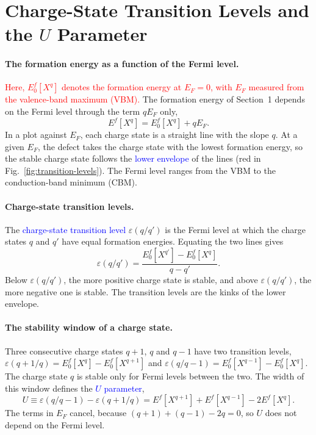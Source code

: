 \section{Charge-State Transition Levels and the $U$ Parameter}

\paragraph{The formation energy as a function of the Fermi level.}
\textcolor{red}{Here, $E^f_0[X^q]$ denotes the formation energy at $E_F=0$,
with $E_F$ measured from the valence-band maximum (VBM).}
The formation energy of Section~1 depends on the Fermi level through the
term $qE_F$ only,
\begin{equation*}
    E^f[X^q]=E^f_0[X^q]+qE_F.
\end{equation*}
In a plot against $E_F$, each charge state is a straight line with the slope
$q$. At a given $E_F$, the defect takes the charge state with the lowest
formation energy, so the stable charge state follows the
\textcolor{blue}{lower envelope} of the lines (red in
Fig.~\ref{fig:transition-levels}). The Fermi level ranges from the VBM to the
conduction-band minimum (CBM).

\paragraph{Charge-state transition levels.}
The \textcolor{blue}{charge-state transition level} $\varepsilon(q/q')$ is the
Fermi level at which the charge states $q$ and $q'$ have equal formation
energies. Equating the two lines gives
\begin{equation}
    \boxed{\varepsilon(q/q')=\frac{E^f_0[X^{q'}]-E^f_0[X^q]}{q-q'}.}
\end{equation}
Below $\varepsilon(q/q')$, the more positive charge state is stable, and
above $\varepsilon(q/q')$, the more negative one is stable. The transition
levels are the kinks of the lower envelope.

\paragraph{The stability window of a charge state.}
Three consecutive charge states $q+1$, $q$ and $q-1$ have two transition
levels, $\varepsilon(q+1/q)=E^f_0[X^q]-E^f_0[X^{q+1}]$ and
$\varepsilon(q/q-1)=E^f_0[X^{q-1}]-E^f_0[X^q]$. The charge state $q$ is
stable only for Fermi levels between the two. The width of this window
defines the \textcolor{blue}{$U$ parameter},
\begin{equation}
    \boxed{U\equiv\varepsilon(q/q-1)-\varepsilon(q+1/q)
    =E^f[X^{q+1}]+E^f[X^{q-1}]-2E^f[X^q].}
\end{equation}
The terms in $E_F$ cancel, because $(q+1)+(q-1)-2q=0$, so $U$ does not depend
on the Fermi level.

